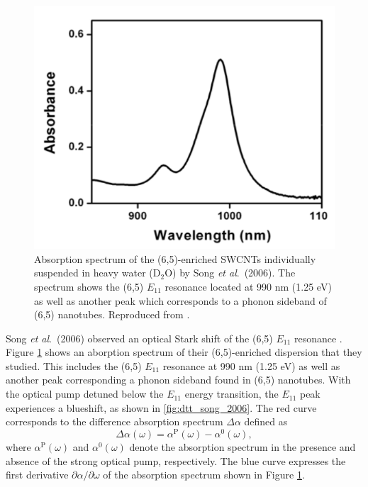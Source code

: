 \begin{figure}[ht]
	\centering
	\includegraphics[scale=0.4]{images/chapter_prior_works/absorption_spectrum_song_2006}
	\caption{Absorption spectrum of the (6,5)-enriched SWCNTs individually suspended in heavy water ($\text{D}_2 \text{O}$) by Song \textit{et al}.\ (2006). The spectrum shows the (6,5) $E_{11}$ resonance located at 990 nm (1.25 eV) as well as another peak which corresponds to a phonon sideband of (6,5) nanotubes. Reproduced from \cite{song2006optical}.}
	\label{fig:abs_song_2006}
\end{figure}

Song \textit{et al}.\ (2006) observed an optical Stark shift of the (6,5) $E_{11}$ resonance \cite{song2006optical}. Figure \ref{fig:abs_song_2006} shows an aborption spectrum of their (6,5)-enriched dispersion that they studied. This includes the (6,5) $E_{11}$ resonance at 990 nm (1.25 eV) as well as another peak corresponding a phonon sideband found in (6,5) nanotubes. With the optical pump detuned below the $E_{11}$ energy transition, the $E_{11}$ peak experiences a blueshift, as shown in \ref{fig:dtt_song_2006}. The red curve corresponds to the difference absorption spectrum $\Delta \alpha$ defined as
\begin{equation}
	\Delta\alpha(\omega) = \alpha^\text{P}(\omega) - \alpha^0(\omega),
\end{equation}
where $\alpha^\text{P}(\omega)$ and $\alpha^\text{0}(\omega)$ denote the absorption spectrum in the presence and absence of the strong optical pump, respectively. The blue curve expresses  the first derivative $\partial\alpha / \partial\omega$ of the absorption spectrum shown in Figure \ref{fig:abs_song_2006}.

